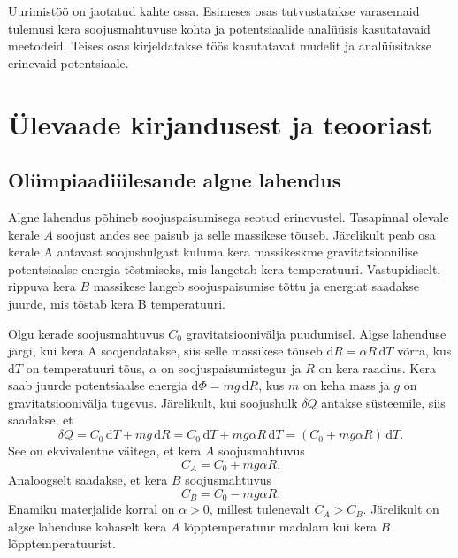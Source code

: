 \documentclass{trkut}%
\begin{document}
Uurimistöö on jaotatud kahte ossa.
Esimeses osas tutvustatakse varasemaid tulemusi kera soojusmahtuvuse kohta ja potentsiaalide analüüsis kasutatavaid meetodeid.
Teises osas kirjeldatakse töös kasutatavat mudelit ja analüüsitakse erinevaid potentsiaale.

\chapter{Ülevaade kirjandusest ja teooriast}

\section{Olümpiaadiülesande algne lahendus} \label{algne}

Algne lahendus põhineb soojuspaisumisega seotud erinevustel. Tasapinnal olevale kerale $A$ soojust andes see paisub ja selle massikese tõuseb. Järelikult peab osa kerale A antavast soojushulgast kuluma kera massikeskme gravitatsioonilise potentsiaalse energia tõstmiseks, mis langetab kera temperatuuri. Vastupidiselt, rippuva kera $B$ massikese langeb soojuspaisumise tõttu ja energiat saadakse juurde, mis tõstab kera B temperatuuri. \parencite[6-7]{ipho67}

Olgu kerade soojusmahtuvus $C_0$ gravitatsioonivälja puudumisel. Algse lahenduse järgi, kui kera A soojendatakse, siis selle massikese tõuseb $\mathrm{d}R=\alpha R \, \mathrm{d}T$ võrra, kus $\mathrm{d}T$ on temperatuuri tõus, $\alpha$ on soojuspaisumistegur ja $R$ on kera raadius. Kera saab juurde potentsiaalse energia $\mathrm{d}\Phi = mg \, \mathrm{d}R$, kus $m$ on keha mass ja $g$ on gravitatsioonivälja tugevus. Järelikult, kui soojushulk \(\delta Q\) antakse süsteemile, siis saadakse, et \parencite[2-3]{palma15}
\begin{equation}
    \delta Q = C_0 \, \mathrm{d}T + mg \, \mathrm{d}R = C_0 \, \mathrm{d}T + mg\alpha R \, \mathrm{d}T = (C_0 +  mg\alpha R) \, \mathrm{d}T.
\end{equation}
See on ekvivalentne väitega, et kera \(A\) soojusmahtuvus
\begin{equation}
    C_A = C_0 + mg\alpha R.
\end{equation}
Analoogselt saadakse, et kera \(B\) soojusmahtuvus
\begin{equation}
    C_B = C_0 - mg\alpha R.
\end{equation}
Enamiku materjalide korral on \(\alpha > 0\), millest tulenevalt \(C_A>C_B\). Järelikult on algse lahenduse kohaselt kera \(A\) lõpptemperatuur madalam kui kera \(B\) lõpptemperatuurist.
\end{document}
